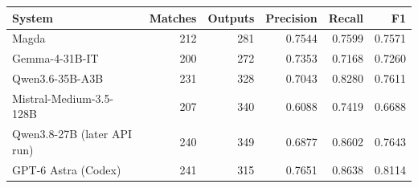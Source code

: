 \begin{tabular}{@{}lrrrrr@{}}
\toprule
System & Matches & Outputs & Precision & Recall & F1 \\
\midrule
Magda & 212 & 281 & 0.7544 & 0.7599 & 0.7571 \\
Gemma-4-31B-IT & 200 & 272 & 0.7353 & 0.7168 & 0.7260 \\
Qwen3.6-35B-A3B & 231 & 328 & 0.7043 & 0.8280 & 0.7611 \\
Mistral-Medium-3.5-128B & 207 & 340 & 0.6088 & 0.7419 & 0.6688 \\
\midrule
Qwen3.8-27B (later API run) & 240 & 349 & 0.6877 & 0.8602 & 0.7643 \\
\midrule
GPT-6 Astra (Codex) & 241 & 315 & 0.7651 & 0.8638 & 0.8114 \\
\bottomrule
\end{tabular}
